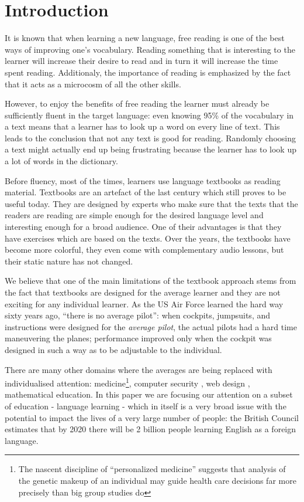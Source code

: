 
\section{Introduction}
It is known that when learning a new language, free reading is one of the best ways of improving one's vocabulary. Reading something that is interesting to the learner will increase their desire to read and in turn it will increase the time spent reading. Additionaly, the importance of reading is emphasized by the fact that it acts as a microcosm of all the other skills. \cite{mccarthy1999-microcosm} 

However, to enjoy the benefits of free reading the learner must already be sufficiently fluent in the target language: even knowing 95\% of the vocabulary in a text means that a learner has to look up a word on every line of text. \cite{Hirsh92-vocab-size} This leads to the conclusion that not any text is good for reading. Randomly choosing a text might actually end up being frustrating because the learner has to look up a lot of words in the dictionary.

Before fluency, most of the times, learners use language textbooks as reading material. Textbooks are an artefact of the last century which still proves to be useful today. They are designed by experts who make sure that the texts that the readers are reading are simple enough for the desired language level and interesting enough for a broad audience. One of their advantages is that they have exercises which are based on the texts. Over the years, the textbooks have become more colorful, they even come with complementary audio lessons, but their static nature has not changed.

We believe that one of the main limitations of the textbook approach stems from the fact that textbooks are designed for the average learner and they are not exciting for any individual learner. As the US Air Force learned the hard way sixty years ago, ``there is no average pilot'': when cockpits, jumpsuits, and instructions were designed for the {\em average pilot}, the actual pilots had a hard time maneuvering the planes; performance improved only when the cockpit was designed in such a way as to be adjustable to the individual. 

There are many other domains where the averages are being replaced with individualised attention: medicine\footnote{The nascent discipline of ``personalized medicine'' suggests that analysis of the genetic makeup of an individual may guide health care decisions far more precisely than big group studies do}, computer security %
, web design\cite{Reinecke13-CulturalAdaptation} , mathematical education\cite{Polozov15-AdaptableMath}. In this paper we are focusing our attention on a subset of education - language learning - which in itself is a very broad issue with the potential to impact the lives of a very large number of people: the British Council estimates that by 2020 there will be 2 billion people learning English as a foreign language. 

